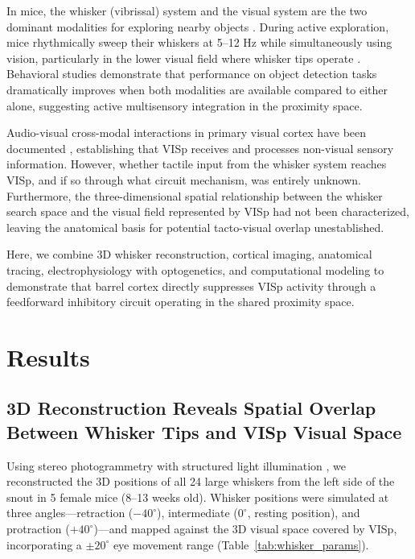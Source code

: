 \documentclass[11pt]{article}
\begin{document}
In mice, the whisker (vibrissal) system and the visual system are the two dominant modalities for exploring nearby objects \citep{petersen2019sensorimotor, diamond2008whisker}. During active exploration, mice rhythmically sweep their whiskers at 5--12 Hz while simultaneously using vision, particularly in the lower visual field where whisker tips operate \citep{deschenes2012sniffing, mitchinson2011active}. Behavioral studies demonstrate that performance on object detection tasks dramatically improves when both modalities are available compared to either alone, suggesting active multisensory integration in the proximity space.

Audio-visual cross-modal interactions in primary visual cortex have been documented \citep{iurilli2012sound, ibrahim2016cross, olcese2013early}, establishing that VISp receives and processes non-visual sensory information. However, whether tactile input from the whisker system reaches VISp, and if so through what circuit mechanism, was entirely unknown. Furthermore, the three-dimensional spatial relationship between the whisker search space and the visual field represented by VISp had not been characterized, leaving the anatomical basis for potential tacto-visual overlap unestablished.

Here, we combine 3D whisker reconstruction, cortical imaging, anatomical tracing, electrophysiology with optogenetics, and computational modeling to demonstrate that barrel cortex directly suppresses VISp activity through a feedforward inhibitory circuit operating in the shared proximity space.

\section{Results}

\subsection{3D Reconstruction Reveals Spatial Overlap Between Whisker Tips and VISp Visual Space}

Using stereo photogrammetry with structured light illumination \citep{heist2018structured}, we reconstructed the 3D positions of all 24 large whiskers from the left side of the snout in 5 female mice (8--13 weeks old). Whisker positions were simulated at three angles---retraction ($-40^\circ$), intermediate ($0^\circ$, resting position), and protraction ($+40^\circ$)---and mapped against the 3D visual space covered by VISp, incorporating a $\pm20^\circ$ eye movement range (Table~\ref{tab:whisker_params}).
\end{document}
